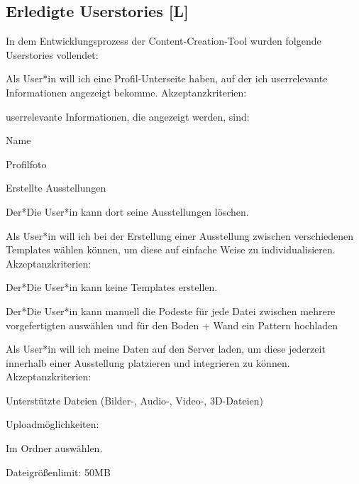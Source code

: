 \subsection{Erledigte Userstories [L]}
In dem Entwicklungsprozess der Content-Creation-Tool wurden folgende Userstories vollendet:
\begin{compactenum}
    \item  Als User*in will ich eine Profil-Unterseite haben, auf der ich userrelevante Informationen angezeigt bekomme. Akzeptanzkriterien:
    \begin{compactitem}
        \item userrelevante Informationen, die angezeigt werden, sind:
        \begin{compactitem}
            \item Name
            \item Profilfoto
            \item Erstellte Ausstellungen        
        \end{compactitem}
        \item Der*Die User*in kann dort seine Ausstellungen löschen.        
    \end{compactitem}
    \item Als User*in will ich bei der Erstellung einer Ausstellung zwischen verschiedenen Templates wählen können, um diese auf einfache Weise zu individualisieren. Akzeptanzkriterien:
    \begin{compactitem}
        \item Der*Die User*in kann keine Templates erstellen.
        \item Der*Die User*in kann manuell die Podeste für jede Datei zwischen mehrere vorgefertigten auswählen und für den Boden + Wand ein Pattern hochladen
    \end{compactitem}
    \item Als User*in will ich meine Daten auf den Server laden, um diese jederzeit innerhalb einer Ausstellung platzieren und integrieren zu können. Akzeptanzkriterien:
    \begin{compactitem}
        \item Unterstützte Dateien (Bilder-, Audio-, Video-, 3D-Dateien)
        \item Uploadmöglichkeiten:
        \begin{compactitem}
            \item Im Ordner auswählen.
        \end{compactitem}
        \item Dateigrößenlimit: 50MB

\end{compactitem}
\end{compactenum}

